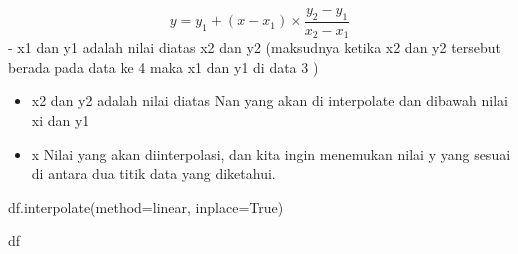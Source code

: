 \documentclass[
  letterpaper,
]{krantz}
\makeatletter
\newenvironment{Shaded}{\begin{snugshade}}{\end{snugshade}}
\newcommand{\NormalTok}[1]{\textcolor[rgb]{0.00,0.23,0.31}{#1}}
\newcommand{\OperatorTok}[1]{\textcolor[rgb]{0.37,0.37,0.37}{#1}}
\newcommand{\StringTok}[1]{\textcolor[rgb]{0.13,0.47,0.30}{#1}}
\newcommand{\VariableTok}[1]{\textcolor[rgb]{0.07,0.07,0.07}{#1}}
\newenvironment{kframe}{%
\medskip{}
\setlength{\fboxsep}{.8em}
 \def\at@end@of@kframe{}%
 \ifinner\ifhmode%
  \def\at@end@of@kframe{\end{minipage}}%
  \begin{minipage}{\columnwidth}%
 \fi\fi%
 \def\FrameCommand##1{\hskip\@totalleftmargin \hskip-\fboxsep
 \colorbox{shadecolor}{##1}\hskip-\fboxsep
     \hskip-\linewidth \hskip-\@totalleftmargin \hskip\columnwidth}%
 \MakeFramed {\advance\hsize-\width
   \@totalleftmargin\z@ \linewidth\hsize
   \@setminipage}}%
 {\par\unskip\endMakeFramed%
 \at@end@of@kframe}
\renewenvironment{Shaded}{\begin{kframe}}{\end{kframe}}
\makeatother
\begin{document}
\[
y = y_1 + (x - x_1) \times \frac{{y_2 - y_1}}{{x_2 - x_1}}
\] - x1 dan y1 adalah nilai diatas x2 dan y2 (maksudnya ketika x2 dan y2
tersebut berada pada data ke 4 maka x1 dan y1 di data 3 )

\begin{itemize}
\item
  x2 dan y2 adalah nilai diatas Nan yang akan di interpolate dan dibawah
  nilai xi dan y1
\item
  x Nilai yang akan diinterpolasi, dan kita ingin menemukan nilai y yang
  sesuai di antara dua titik data yang diketahui.
\end{itemize}

\begin{Shaded}
\begin{Highlighting}[]
\NormalTok{df.interpolate(method}\OperatorTok{=}\StringTok{\textquotesingle{}linear\textquotesingle{}}\NormalTok{, inplace}\OperatorTok{=}\VariableTok{True}\NormalTok{)}

\NormalTok{df}
\end{Highlighting}
\end{Shaded}
\end{document}
